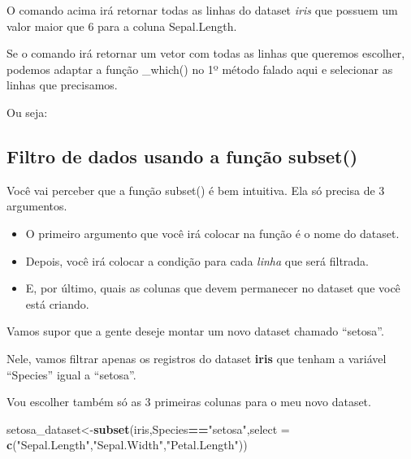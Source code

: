 \documentclass[
]{book}
\newenvironment{Shaded}{\begin{snugshade}}{\end{snugshade}}
\newcommand{\DataTypeTok}[1]{\textcolor[rgb]{0.13,0.29,0.53}{#1}}
\newcommand{\DecValTok}[1]{\textcolor[rgb]{0.00,0.00,0.81}{#1}}
\newcommand{\KeywordTok}[1]{\textcolor[rgb]{0.13,0.29,0.53}{\textbf{#1}}}
\newcommand{\NormalTok}[1]{#1}
\newcommand{\OperatorTok}[1]{\textcolor[rgb]{0.81,0.36,0.00}{\textbf{#1}}}
\newcommand{\StringTok}[1]{\textcolor[rgb]{0.31,0.60,0.02}{#1}}
\begin{document}
O comando acima irá retornar todas as linhas do dataset \emph{iris} que
possuem um valor maior que 6 para a coluna Sepal.Length.

Se o comando irá retornar um vetor com todas as linhas que queremos
escolher, podemos adaptar a função \_which() no 1º método falado aqui e
selecionar as linhas que precisamos.

Ou seja:

\begin{Shaded}
\end{Shaded}

\hypertarget{filtro-de-dados-usando-a-funuxe7uxe3o-subset}{%
\subsection{Filtro de dados usando a função
subset()}\label{filtro-de-dados-usando-a-funuxe7uxe3o-subset}}

Você vai perceber que a função subset() é bem intuitiva. Ela só precisa
de 3 argumentos.

\begin{itemize}
\item
  O primeiro argumento que você irá colocar na função é o nome do
  dataset.
\item
  Depois, você irá colocar a condição para cada \emph{linha} que será
  filtrada.
\item
  E, por último, quais as colunas que devem permanecer no dataset que
  você está criando.
\end{itemize}

Vamos supor que a gente deseje montar um novo dataset chamado
``setosa''.

Nele, vamos filtrar apenas os registros do dataset \textbf{iris} que
tenham a variável ``Species'' igual a ``setosa''.

Vou escolher também só as 3 primeiras colunas para o meu novo dataset.

\begin{Shaded}
\begin{Highlighting}[]
\NormalTok{setosa_dataset<-}\KeywordTok{subset}\NormalTok{(iris,Species}\OperatorTok{==}\StringTok{"setosa"}\NormalTok{,}\DataTypeTok{select =} \KeywordTok{c}\NormalTok{(}\StringTok{"Sepal.Length"}\NormalTok{,}\StringTok{"Sepal.Width"}\NormalTok{,}\StringTok{"Petal.Length"}\NormalTok{))}
\end{Highlighting}
\end{Shaded}
\end{document}
